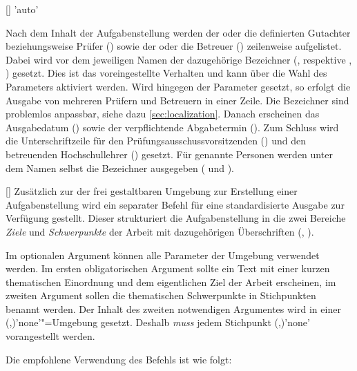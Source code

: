 \begin{Bundle*}{}
\begin{Declaration}{[]}{%
  'auto'%
}
\begin{Declaration}{}
\begin{Declaration}[v2.05]{}
Nach dem Inhalt der Aufgabenstellung werden der oder die definierten Gutachter 
beziehungsweise Prüfer () sowie der oder die Betreuer 
() zeilenweise aufgelistet. Dabei wird vor dem jeweiligen 
Namen der dazugehörige Bezeichner (,  
respektive , ) gesetzt. 
Dies ist das voreingestellte Verhalten und kann über die Wahl des Parameters
 aktiviert werden. Wird hingegen 
der Parameter  gesetzt, so 
erfolgt die Ausgabe von mehreren Prüfern und Betreuern in einer Zeile. Die 
Bezeichner sind problemlos anpassbar, siehe dazu \autoref{sec:localization}.
Danach erscheinen das Ausgabedatum () sowie der verpflichtende 
Abgabetermin (). Zum Schluss wird die Unterschriftzeile für den 
Prüfungsausschussvorsitzenden () und den betreuenden 
Hochschullehrer () gesetzt. Für genannte Personen werden unter 
dem Namen selbst die Bezeichner ausgegeben ( und 
).
\end{Declaration}
\end{Declaration}
\end{Declaration}

\begin{Declaration}{%
  [\LParameter{}]%
}
\printdeclarationlist%
%
Zusätzlich zur der frei gestaltbaren Umgebung  zur Erstellung
einer Aufgabenstellung wird ein separater Befehl für eine standardisierte 
Ausgabe zur Verfügung gestellt. Dieser strukturiert die Aufgabenstellung in die 
zwei Bereiche \emph{Ziele} und \emph{Schwerpunkte} der Arbeit mit dazugehörigen 
Überschriften (, ).

Im optionalen Argument können alle Parameter der Umgebung  
verwendet werden. Im ersten obligatorischen Argument sollte ein Text mit einer 
kurzen thematischen Einordnung und dem eigentlichen Ziel der Arbeit erscheinen, 
im zweiten Argument sollen die thematischen Schwerpunkte in Stichpunkten 
benannt werden. Der Inhalt des zweiten notwendigen Argumentes wird in einer 
(,)'none'"=Umgebung
gesetzt. Deshalb \emph{muss} jedem Stichpunkt 
(,)'none' vorangestellt 
werden.
\end{Declaration}
%
\begin{Example}
Die empfohlene Verwendung des Befehls  ist wie folgt:
\begin{Code}[escapechar=§]
\end{Code}
\end{Example}
\end{Bundle*}
